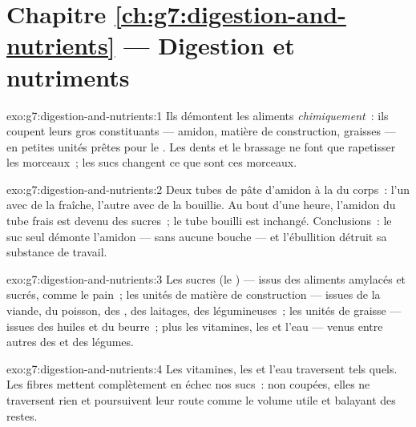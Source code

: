 \section*{Chapitre \ref{ch:g7:digestion-and-nutrients} --- Digestion et nutriments}

\begin{solution}{exo:g7:digestion-and-nutrients:1}
Ils démontent les aliments \emph{chimiquement}~: ils coupent leurs
gros constituants --- amidon, matière de construction, graisses ---
en petites unités prêtes pour le . Les dents et le brassage ne
font que rapetisser les morceaux~; les sucs changent ce que sont ces
morceaux.
\end{solution}

\begin{solution}{exo:g7:digestion-and-nutrients:2}
Deux tubes de pâte d'amidon à la  du corps~: l'un avec de
la  fraîche, l'autre avec de la  bouillie. Au bout d'une
heure, l'amidon du tube frais est devenu des sucres~; le tube
bouilli est inchangé. Conclusions~: le suc seul démonte l'amidon ---
sans aucune bouche --- et l'ébullition détruit sa substance de
travail.
\end{solution}

\begin{solution}{exo:g7:digestion-and-nutrients:3}
Les sucres (le ) --- issus des aliments amylacés et sucrés,
comme le pain~; les unités de matière de construction --- issues de
la viande, du poisson, des , des laitages, des légumineuses~;
les unités de graisse --- issues des huiles et du beurre~; plus les
vitamines, les  et l'eau --- venus entre autres des
 et des légumes.
\end{solution}

\begin{solution}{exo:g7:digestion-and-nutrients:4}
Les vitamines, les  et l'eau traversent tels quels. Les
fibres mettent complètement en échec nos sucs~: non coupées, elles
ne traversent rien et poursuivent leur route comme le volume utile
et balayant des restes.
\end{solution}

